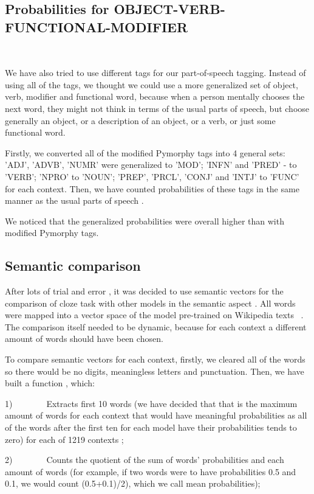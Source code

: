 \documentclass[a4paper]{article}
\begin{document}
\subsection{Probabilities for OBJECT-VERB-FUNCTIONAL-MODIFIER} %

We have also tried to use different tags for our part-of-speech tagging. Instead of using all of the tags, we thought we could use a more generalized set of object, verb, modifier and functional word, because when a person mentally chooses the next word, they might not think in terms of the usual parts of speech, but choose generally an object, or a description of an object, or a verb, or just some functional word.

Firstly, we converted all of the modified Pymorphy tags into 4 general sets: 'ADJ', 'ADVB', 'NUMR' were generalized to 'MOD'; 'INFN' and 'PRED' - to 'VERB'; 'NPRO' to 'NOUN'; 'PREP', 'PRCL', 'CONJ' and 'INTJ' to 'FUNC' for each context. Then, we have counted probabilities of these tags in the same manner as the usual parts of speech
. 

We noticed that the generalized probabilities were overall higher than with modified Pymorphy tags.

\subsection{Semantic comparison} %

After lots of trial and error
, it was decided to use semantic vectors for the comparison of cloze task with other models in the semantic aspect
. All words were mapped into a vector space of the model pre-trained on Wikipedia texts
 \cite{arefyev}. The comparison itself needed to be dynamic, because for each context a different amount of words should have been chosen.

To compare semantic vectors for each context, firstly, we cleared all of the words so there would be no digits, meaningless letters and punctuation. Then, we have built a function
, which:

1)        Extracts first 10 words (we have decided that that is the maximum amount of words for each context that would have meaningful probabilities as all of the words after the first ten for each model have their probabilities tends to zero) for each of 1219 contexts
;

2)        Counts the quotient of the sum of words’ probabilities and each amount of words (for example, if two words were to have probabilities 0.5 and 0.1, we would count (0.5+0.1)/2), which we call mean probabilities);
\end{document}
